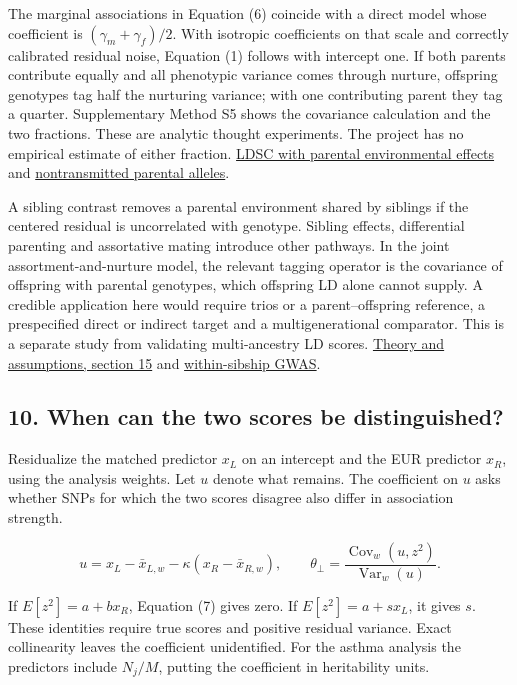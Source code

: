 \documentclass[11pt,a4paper]{article}
\let\reportsection\subsection
\newif\ifinsupplement
\renewcommand{\subsection}[1]{\clearpage
  \ifstrequal{#1}{Supplementary Methods}{\insupplementtrue
    \fancyhead[R]{\small\sffamily Supplementary methods}}{}
  \reportsection{#1}}
\begin{document}
The marginal associations in Equation (6) coincide with a direct model whose coefficient is \((\gamma_m+\gamma_f)/2\). With isotropic coefficients on that scale and correctly calibrated residual noise, Equation (1) follows with intercept one. If both parents contribute equally and all phenotypic variance comes through nurture, offspring genotypes tag half the nurturing variance; with one contributing parent they tag a quarter. Supplementary Method S5 shows the covariance calculation and the two fractions. These are analytic thought experiments. The project has no empirical estimate of either fraction. \href{https://doi.org/10.1002/gepi.22161}{LDSC with parental environmental effects} and \href{https://doi.org/10.1126/science.aan6877}{nontransmitted parental alleles}.

A sibling contrast removes a parental environment shared by siblings if the centered residual is uncorrelated with genotype. Sibling effects, differential parenting and assortative mating introduce other pathways. In the joint assortment-and-nurture model, the relevant tagging operator is the covariance of offspring with parental genotypes, which offspring LD alone cannot supply. A credible application here would require trios or a parent--offspring reference, a prespecified direct or indirect target and a multigenerational comparator. This is a separate study from validating multi-ancestry LD scores. \href{../docs/METHOD.md}{Theory and assumptions, section 15} and \href{https://doi.org/10.1038/s41588-022-01062-7}{within-sibship GWAS}.

\subsection{10. When can the two scores be distinguished?}\label{10-when-can-the-two-scores-be-distinguished}

Residualize the matched predictor \(x_L\) on an intercept and the EUR predictor \(x_R\), using the analysis weights. Let \(u\) denote what remains. The coefficient on \(u\) asks whether SNPs for which the two scores disagree also differ in association strength.

\[
 u=x_L-\bar x_{L,w}-\kappa(x_R-\bar x_{R,w}),\qquad
 \theta_\perp=\frac{\operatorname{Cov}_w(u,z^2)}{\operatorname{Var}_w(u)}.
 \tag{7}
\]

If \(E[z^2]=a+b x_R\), Equation (7) gives zero. If \(E[z^2]=a+s x_L\), it gives \(s\). These identities require true scores and positive residual variance. Exact collinearity leaves the coefficient unidentified. For the asthma analysis the predictors include \(N_j/M\), putting the coefficient in heritability units.
\end{document}

